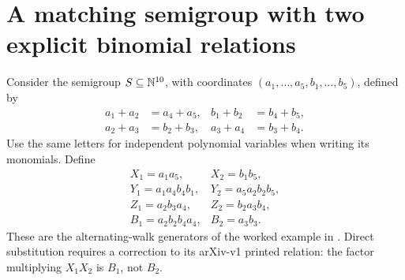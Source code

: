 \section{A matching semigroup with two explicit binomial relations}
Consider the semigroup \(S\subseteq\mathbb{N}^{10}\), with coordinates
\((a_1,\ldots,a_5,b_1,\ldots,b_5)\), defined by
\[
 \begin{aligned}
 a_1+a_2&=a_4+a_5,& b_1+b_2&=b_4+b_5,\\
 a_2+a_3&=b_2+b_3,& a_3+a_4&=b_3+b_4.
 \end{aligned}
 \tag{G16}
\]
Use the same letters for independent polynomial variables when writing its monomials. Define
\[
\begin{array}{ll}
 X_1=a_1a_5,&X_2=b_1b_5,\\
 Y_1=a_1a_4b_4b_1,&Y_2=a_5a_2b_2b_5,\\
 Z_1=a_2b_3a_4,&Z_2=b_2a_3b_4,\\
 B_1=a_2b_2b_4a_4,&B_2=a_3b_3.
\end{array}
 \tag{G17}
\]
These are the alternating-walk generators of the worked example in \citet[Example 8.20]{smtCW2011}. Direct substitution requires a correction to its arXiv-v1 printed relation: the factor multiplying \(X_1X_2\) is \(B_1\), not \(B_2\).

